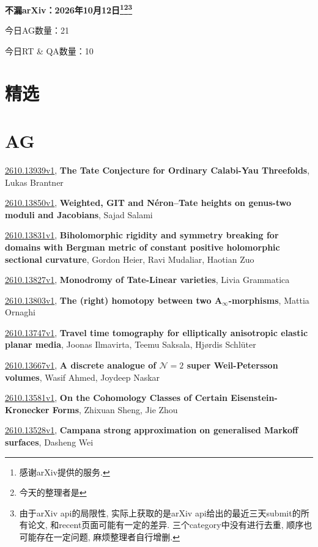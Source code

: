 \documentclass[9pt, a4paper]{article}
\theoremstyle{plain}
\theoremstyle{definition}
\theoremstyle{remark}
\newcommand{\arxiv}[3]{\href{https://arxiv.org/abs/#1}{#1}, \textbf{\textcolor{arxivblue}{#2}}, #3}
\newcommand{\AGnumber}{21}
\newcommand{\RTQAnumber}{10}
\newcommand{\NewestDate}{2026年10月12日}
\newcommand{\todayarXiver}{} %
\begin{document}
\begin{center}
    \Huge\textbf{不漏arXiv：\NewestDate\footnote{感谢arXiv提供的服务.}\footnote{今天的整理者是\todayarXiver}\footnote{由于arXiv api的局限性, 实际上获取的是arXiv api给出的最近三天submit的所有论文, 和recent页面可能有一定的差异. 三个category中没有进行去重, 顺序也可能存在一定问题, 麻烦整理者自行增删.}} \\
\end{center}

\setcounter{section}{-1}

\begin{center}
    今日AG数量：\AGnumber
    
    今日RT \& QA数量：\RTQAnumber
    
\end{center}


\section{精选}


\section{AG}
\arxiv{2610.13939v1}{The Tate Conjecture for Ordinary Calabi-Yau Threefolds}{Lukas Brantner}

\arxiv{2610.13850v1}{Weighted, GIT and Néron--Tate heights on genus-two moduli and Jacobians}{Sajad Salami}

\arxiv{2610.13831v1}{Biholomorphic rigidity and symmetry breaking for domains with Bergman metric of constant positive holomorphic sectional curvature}{Gordon Heier, Ravi Mudaliar, Haotian Zuo}

\arxiv{2610.13827v1}{Monodromy of Tate-Linear varieties}{Livia Grammatica}

\arxiv{2610.13803v1}{The (right) homotopy between two A$_{\infty}$-morphisms}{Mattia Ornaghi}

\arxiv{2610.13747v1}{Travel time tomography for elliptically anisotropic elastic planar media}{Joonas Ilmavirta, Teemu Saksala, Hjørdis Schlüter}

\arxiv{2610.13667v1}{A discrete analogue of $\mathscr{N}=2$ super Weil-Petersson volumes}{Wasif Ahmed, Joydeep Naskar}

\arxiv{2610.13581v1}{On the Cohomology Classes of Certain Eisenstein-Kronecker Forms}{Zhixuan Sheng, Jie Zhou}

\arxiv{2610.13528v1}{Campana strong approximation on generalised Markoff surfaces}{Dasheng Wei}
\end{document}
